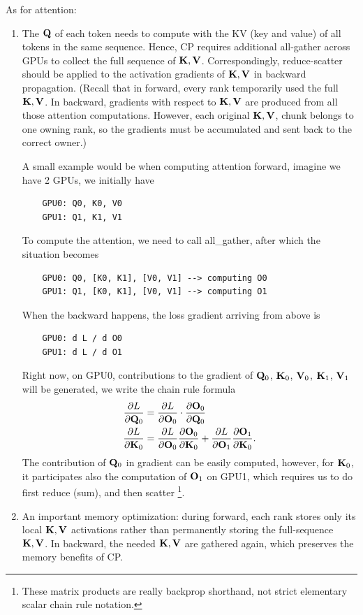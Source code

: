 \documentclass[11pt]{article}  %
\begin{document}
As for attention:
\begin{enumerate}
  \item The $\mathbf{Q}$ of each token needs to compute with the KV (key and value) of all tokens in the same sequence.
  Hence, CP requires additional all-gather across GPUs to collect the full sequence of $\mathbf{K}, \mathbf{V}$.
  Correspondingly, reduce-scatter should be applied to the activation gradients of $\mathbf{K}, \mathbf{V}$ in backward propagation.
  (Recall that in forward, every rank temporarily used the full $\mathbf{K}, \mathbf{V}$. In backward, gradients with respect to $\mathbf{K}, \mathbf{V}$ are produced from all those attention computations. However, each original $\mathbf{K}, \mathbf{V}$, chunk belongs to one owning rank, so the gradients must be accumulated and sent back to the correct owner.)

  A small example would be when computing attention forward, imagine we have 2 GPUs, we initially have 
  \begin{verbatim}
    GPU0: Q0, K0, V0 
    GPU1: Q1, K1, V1
  \end{verbatim}
  To compute the attention, we need to call all\_gather, after which the situation becomes 
  \begin{verbatim}
    GPU0: Q0, [K0, K1], [V0, V1] --> computing O0
    GPU1: Q1, [K0, K1], [V0, V1] --> computing O1
  \end{verbatim}
  When the backward happens, the loss gradient arriving from above is 
  \begin{verbatim}
    GPU0: d L / d O0
    GPU1: d L / d O1
  \end{verbatim}
  Right now, on GPU0, contributions to the gradient of $\mathbf{Q}_0$, $\mathbf{K}_0$, $\mathbf{V}_0$, $\mathbf{K}_1$, $\mathbf{V}_1$ will be generated, we write the chain rule formula 
  \begin{align*}
    \frac{\partial L}{\partial \mathbf{Q}_0} &= \frac{\partial L}{\partial \mathbf{O}_0} \cdot \frac{\partial \mathbf{O}_0}{\partial \mathbf{Q}_0} \\
    \frac{\partial L}{\partial \mathbf{K}_0} &= \frac{\partial L}{\partial \mathbf{O}_0}\frac{\partial \mathbf{O}_0}{\partial \mathbf{K}_0} + \frac{\partial L}{\partial \mathbf{O}_1}\frac{\partial \mathbf{O}_1}{\partial \mathbf{K}_0}.
  \end{align*}
  The contribution of $\mathbf{Q}_0$ in gradient can be easily computed, however, for $\mathbf{K}_0$, it participates also the computation of $\mathbf{O}_1$ on GPU1, which requires us to do first reduce (sum), and then scatter \footnote{These matrix products are really backprop shorthand, not strict elementary scalar chain rule notation.}.

  \item An important memory optimization: during forward, each rank stores only its local $\mathbf{K}, \mathbf{V}$ activations rather than permanently storing the full-sequence $\mathbf{K}, \mathbf{V}$. In backward, the needed $\mathbf{K}, \mathbf{V}$ are gathered again, which preserves the memory benefits of CP.
  

\end{enumerate}
\end{document}
